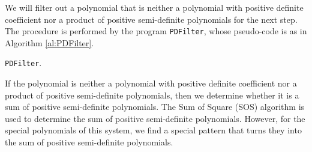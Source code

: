 \documentclass[10pt,a4paper]{article}
\begin{document}
We will filter out a polynomial that is neither a polynomial with positive definite coefficient nor a product of positive semi-definite polynomials for the next step. The procedure is performed by the program \texttt{PDFilter}, whose pseudo-code is as in Algorithm \ref{al:PDFilter}.

\begin{algorithm}[!ht]
\caption{\texttt{PDFilter}.\label{al:PDFilter}}
\end{algorithm}

If the polynomial is neither a polynomial with positive definite coefficient nor a product of positive semi-definite polynomials, then we determine whether it is a sum of positive semi-definite polynomials. The Sum of Square (SOS) algorithm is used to determine the sum of positive semi-definite polynomials. However, for the special polynomials of this system, we find a special pattern that turns they into the sum of positive semi-definite polynomials.
\end{document}
